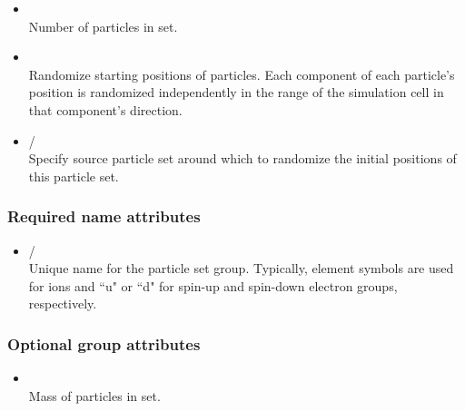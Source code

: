 \begin{itemize}
\item {} \\
Number of particles in set.
\end{itemize}


\begin{itemize}
\item {} \\
Randomize starting positions of particles. Each component of each particle's position is randomized independently in the range of the simulation cell in that component's direction. 
\end{itemize}

\begin{itemize}
\item {}/ \\
Specify source particle set around which to randomize the initial positions of this particle set.
\end{itemize}

\subsubsection{Required name attributes}

\begin{itemize}
\item {}/ \\
Unique name for the particle set group. Typically, element symbols are used for ions and ``u" or ``d" for spin-up and spin-down electron groups, respectively. 
\end{itemize}

\subsubsection{Optional group attributes}

\begin{itemize}
\item {} \\
Mass of particles in set.
\end{itemize}

